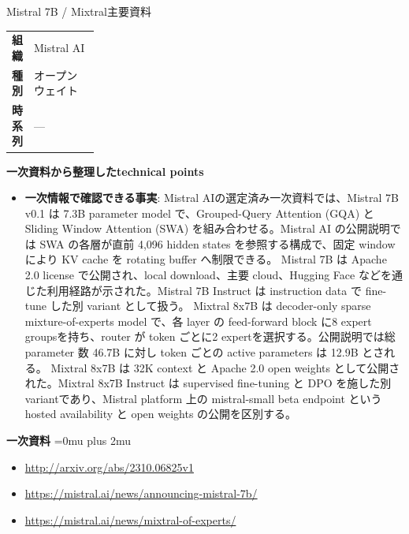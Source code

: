 \begin{technicalnote}{Mistral 7B / Mixtral}{主要資料}
\begingroup
\begin{tabularx}{\linewidth}{@{}>{\bfseries}p{0.22\linewidth}X@{}}
組織 & Mistral AI \\
種別 & オープンウェイト \\
時系列 & — \\
\end{tabularx}
\smallskip
{\bfseries 一次資料から整理したtechnical points}
\begin{itemize}[leftmargin=1.5em,itemsep=0.35em]
\item \textbf{一次情報で確認できる事実}: Mistral AIの選定済み一次資料では、Mistral 7B v0.1 は 7.3B parameter model で、Grouped-Query Attention (GQA) と Sliding Window Attention (SWA) を組み合わせる。Mistral AI の公開説明では SWA の各層が直前 4,096 hidden states を参照する構成で、固定 window により KV cache を rotating buffer へ制限できる。 Mistral 7B は Apache 2.0 license で公開され、local download、主要 cloud、Hugging Face などを通じた利用経路が示された。Mistral 7B Instruct は instruction data で fine-tune した別 variant として扱う。 Mixtral 8x7B は decoder-only sparse mixture-of-experts model で、各 layer の feed-forward block に8 expert groupsを持ち、router が token ごとに2 expertを選択する。公開説明では総 parameter 数 46.7B に対し token ごとの active parameters は 12.9B とされる。 Mixtral 8x7B は 32K context と Apache 2.0 open weights として公開された。Mixtral 8x7B Instruct は supervised fine-tuning と DPO を施した別 variantであり、Mistral platform 上の mistral-small beta endpoint という hosted availability と open weights の公開を区別する。
\end{itemize}
\begin{minipage}{\linewidth}
\begin{samepage}
{\bfseries 一次資料}
\begingroup\sloppy
\Urlmuskip=0mu plus 2mu\relax
\begin{itemize}[leftmargin=1.5em,itemsep=0.25em]
\item {\scriptsize\url{http://arxiv.org/abs/2310.06825v1}}
\item {\scriptsize\url{https://mistral.ai/news/announcing-mistral-7b/}}
\item {\scriptsize\url{https://mistral.ai/news/mixtral-of-experts/}}
\end{itemize}
\endgroup
\end{samepage}
\end{minipage}
\endgroup
\end{technicalnote}
\medskip

